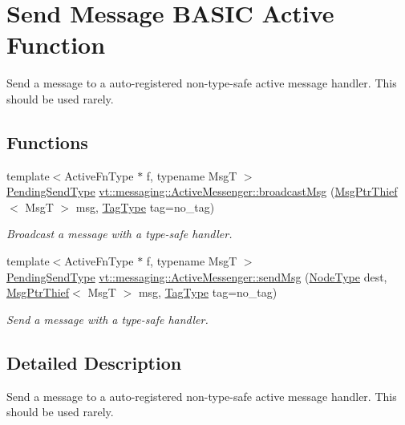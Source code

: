 \hypertarget{group__basicsend}{}\section{Send Message B\+A\+S\+IC Active Function}
\label{group__basicsend}


Send a message to a auto-\/registered non-\/type-\/safe active message handler. This should be used rarely.  


\subsection*{Functions}
\begin{DoxyCompactItemize}
\item 
{\footnotesize template$<$Active\+Fn\+Type $\ast$ f, typename MsgT $>$ }\\\hyperlink{structvt_1_1messaging_1_1_active_messenger_a3626a6ca76d8ad4ec7c3b47a2c70d3a8}{Pending\+Send\+Type} \hyperlink{group__basicsend_ga06f3b2d69156852600ead958ae95e3c9}{vt\+::messaging\+::\+Active\+Messenger\+::broadcast\+Msg} (\hyperlink{structvt_1_1messaging_1_1_msg_ptr_thief}{Msg\+Ptr\+Thief}$<$ MsgT $>$ msg, \hyperlink{namespacevt_a84ab281dae04a52a4b243d6bf62d0e52}{Tag\+Type} tag=no\+\_\+tag)
\begin{DoxyCompactList}\small\item\em Broadcast a message with a type-\/safe handler. \end{DoxyCompactList}\item 
{\footnotesize template$<$Active\+Fn\+Type $\ast$ f, typename MsgT $>$ }\\\hyperlink{structvt_1_1messaging_1_1_active_messenger_a3626a6ca76d8ad4ec7c3b47a2c70d3a8}{Pending\+Send\+Type} \hyperlink{group__basicsend_gaab0dc380a72f038f4fc2350ba89de98f}{vt\+::messaging\+::\+Active\+Messenger\+::send\+Msg} (\hyperlink{namespacevt_a866da9d0efc19c0a1ce79e9e492f47e2}{Node\+Type} dest, \hyperlink{structvt_1_1messaging_1_1_msg_ptr_thief}{Msg\+Ptr\+Thief}$<$ MsgT $>$ msg, \hyperlink{namespacevt_a84ab281dae04a52a4b243d6bf62d0e52}{Tag\+Type} tag=no\+\_\+tag)
\begin{DoxyCompactList}\small\item\em Send a message with a type-\/safe handler. \end{DoxyCompactList}\end{DoxyCompactItemize}


\subsection{Detailed Description}
Send a message to a auto-\/registered non-\/type-\/safe active message handler. This should be used rarely. 


